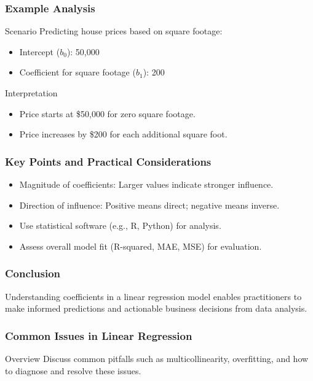 \documentclass[aspectratio=169]{beamer}
\begin{document}
\begin{frame}[fragile]
    \frametitle{Example Analysis}
    \begin{block}{Scenario}
        Predicting house prices based on square footage:
        \begin{itemize}
            \item Intercept (\( b_0 \)): 50,000
            \item Coefficient for square footage (\( b_1 \)): 200
        \end{itemize}
    \end{block}
    \begin{block}{Interpretation}
        \begin{itemize}
            \item Price starts at \$50,000 for zero square footage.
            \item Price increases by \$200 for each additional square foot.
        \end{itemize}
    \end{block}
\end{frame}

\begin{frame}[fragile]
    \frametitle{Key Points and Practical Considerations}
    \begin{itemize}
        \item Magnitude of coefficients: Larger values indicate stronger influence.
        \item Direction of influence: Positive means direct; negative means inverse.
        \item Use statistical software (e.g., R, Python) for analysis.
        \item Assess overall model fit (R-squared, MAE, MSE) for evaluation.
    \end{itemize}
\end{frame}

\begin{frame}[fragile]
    \frametitle{Conclusion}
    Understanding coefficients in a linear regression model enables practitioners to make informed predictions and actionable business decisions from data analysis.
\end{frame}

\begin{frame}[fragile]
    \frametitle{Common Issues in Linear Regression}
    \begin{block}{Overview}
        Discuss common pitfalls such as multicollinearity, overfitting, and how to diagnose and resolve these issues.
    \end{block}
\end{frame}
\end{document}
